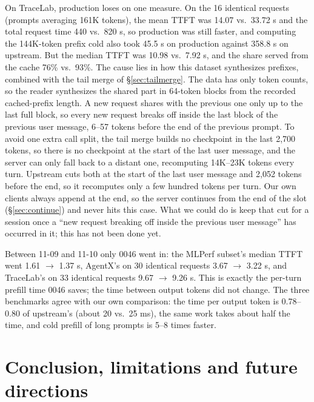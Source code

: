 \documentclass[11pt,a4paper]{article}
\begin{document}
On TraceLab, production loses on one measure. On the 16 identical requests (prompts averaging 161K tokens), the mean TTFT was 14.07 vs.\ 33.72 s and the total request time 440 vs.\ 820 s, so production was still faster, and computing the 144K-token prefix cold also took 45.5 s on production against 358.8 s on upstream. But the median TTFT was 10.98 vs.\ 7.92 s, and the share served from the cache 76\% vs.\ 93\%. The cause lies in how this dataset synthesizes prefixes, combined with the tail merge of \S\ref{sec:tailmerge}. The data has only token counts, so the reader synthesizes the shared part in 64-token blocks from the recorded cached-prefix length. A new request shares with the previous one only up to the last full block, so every new request breaks off inside the last block of the previous user message, 6--57 tokens before the end of the previous prompt. To avoid one extra call split, the tail merge builds no checkpoint in the last 2,700 tokens, so there is no checkpoint at the start of the last user message, and the server can only fall back to a distant one, recomputing 14K--23K tokens every turn. Upstream cuts both at the start of the last user message and 2,052 tokens before the end, so it recomputes only a few hundred tokens per turn. Our own clients always append at the end, so the server continues from the end of the slot (\S\ref{sec:continue}) and never hits this case. What we could do is keep that cut for a session once a ``new request breaking off inside the previous user message'' has occurred in it; this has not been done yet.

Between 11-09 and 11-10 only 0046 went in: the MLPerf subset's median TTFT went 1.61 $\to$ 1.37 s, AgentX's on 30 identical requests 3.67 $\to$ 3.22 s, and TraceLab's on 33 identical requests 9.67 $\to$ 9.26 s. This is exactly the per-turn prefill time 0046 saves; the time between output tokens did not change. The three benchmarks agree with our own comparison: the time per output token is 0.78--0.80 of upstream's (about 20 vs.\ 25 ms), the same work takes about half the time, and cold prefill of long prompts is 5--8 times faster.

\section{Conclusion, limitations and future directions}
\end{document}
